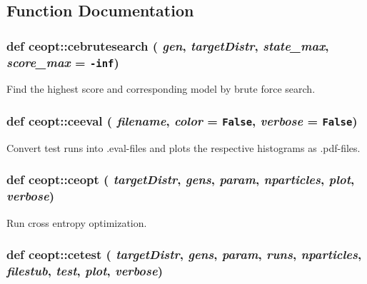\subsection{Function Documentation}
\hypertarget{namespaceceopt_7e223ba50a9bfff0599dd2ec8a823ca3}{
\subsubsection[{cebrutesearch}]{\setlength{\rightskip}{0pt plus 5cm}def ceopt::cebrutesearch ( {\em gen}, \/   {\em targetDistr}, \/   {\em state\_\-max}, \/   {\em score\_\-max} = {\tt -inf})}}
\label{namespaceceopt_7e223ba50a9bfff0599dd2ec8a823ca3}


Find the highest score and corresponding model by brute force search. 

\hypertarget{namespaceceopt_221be49549179d59d8c5bfe30706ca2c}{
\subsubsection[{ceeval}]{\setlength{\rightskip}{0pt plus 5cm}def ceopt::ceeval ( {\em filename}, \/   {\em color} = {\tt False}, \/   {\em verbose} = {\tt False})}}
\label{namespaceceopt_221be49549179d59d8c5bfe30706ca2c}


Convert test runs into .eval-files and plots the respective histograms as .pdf-files. 

\hypertarget{namespaceceopt_7c618a38f2a7288326b5cd95efc4be86}{
\subsubsection[{ceopt}]{\setlength{\rightskip}{0pt plus 5cm}def ceopt::ceopt ( {\em targetDistr}, \/   {\em gens}, \/   {\em param}, \/   {\em nparticles}, \/   {\em plot}, \/   {\em verbose})}}
\label{namespaceceopt_7c618a38f2a7288326b5cd95efc4be86}


Run cross entropy optimization. 

\hypertarget{namespaceceopt_59ffe1ffe93974a9623cac3917f0c409}{
\subsubsection[{cetest}]{\setlength{\rightskip}{0pt plus 5cm}def ceopt::cetest ( {\em targetDistr}, \/   {\em gens}, \/   {\em param}, \/   {\em runs}, \/   {\em nparticles}, \/   {\em filestub}, \/   {\em test}, \/   {\em plot}, \/   {\em verbose})}}
\label{namespaceceopt_59ffe1ffe93974a9623cac3917f0c409}


